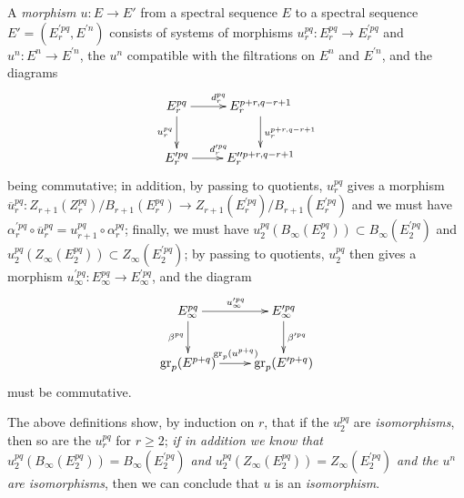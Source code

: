 \begin{env}[11.1.2]
\label{0.11.1.2}
A \emph{morphism $u:E\to E'$} from a spectral sequence $E$ to a spectral sequence $E'=(E_r^{\prime pq},E^{\prime n})$ consists of systems of morphisms $u_r^{pq}:E_r^{pq}\to E_r^{\prime pq}$ and $u^n:E^n\to E^{\prime n}$, the $u^n$ compatible with the filtrations on $E^n$ and $E^{\prime n}$, and the diagrams
\[
  \xymatrix{
    E_r^{pq}\ar[r]^{d_r^{pq}}\ar[d]_{u_r^{pq}} &
    E_r^{p+r,q-r+1}\ar[d]^{u_r^{p+r,q-r+1}}\\
    E_r^{\prime pq}\ar[r]^{d_r^{\prime pq}} &
    E_r'^{\prime p+r,q-r+1}
  }
\]
being commutative; in addition, by passing to quotients, $u_r^{pq}$ gives a morphism $\overline{u}_r^{pq}:Z_{r+1}(Z_r^{pq})/B_{r+1}(E_r^{pq})\to Z_{r+1}(E_r^{\prime pq})/B_{r+1}(E_r^{\prime pq})$ and we must have $\alpha_r^{\prime pq}\circ\overline{u}_r^{pq}=u_{r+1}^{pq}\circ\alpha_r^{pq}$; finally, we must have $u_2^{pq}(B_\infty(E_2^{pq}))\subset B_\infty(E_2^{\prime pq})$ and $u_2^{pq}(Z_\infty(E_2^{pq}))\subset Z_\infty(E_2^{\prime pq})$; by passing to quotients, $u_2^{pq}$ then gives a morphism $u_\infty^{\prime pq}:E_\infty^{pq}\to E_\infty^{\prime pq}$, and the diagram
\[
  \xymatrix{
    E_\infty^{pq}\ar[r]^{u_\infty^{\prime pq}}\ar[d]_{\beta^{pq}} &
    E_\infty^{\prime pq}\ar[d]^{\beta^{\prime pq}}\\
    \gr_p(E^{p+q})\ar[r]^{\gr_p(u^{p+q})} &
    \gr_p(E^{\prime p+q})
  }
\]
must be commutative.

The above definitions show, by induction on $r$, that if the $u_2^{pq}$ are \emph{isomorphisms}, then so are the $u_r^{pq}$ for $r\geq 2$; \emph{if in addition we know that $u_2^{pq}(B_\infty(E_2^{pq}))=B_\infty(E_2^{\prime pq})$ and $u_2^{pq}(Z_\infty(E_2^{pq}))=Z_\infty(E_2^{\prime pq})$ and the $u^n$ are isomorphisms}, then we can conclude that $u$ is an \emph{isomorphism}.
\end{env}

